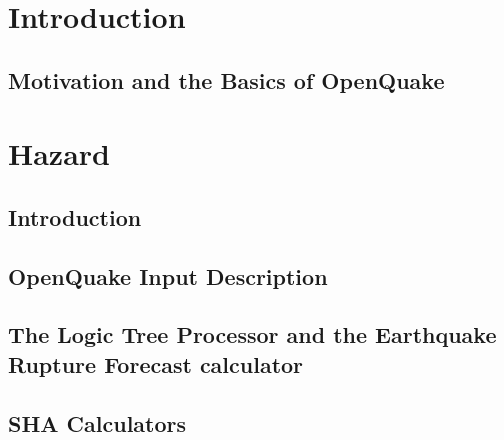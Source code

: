 \documentclass[11pt,a4paper,headings=small,dvips]{scrbook}
\begin{document}
\part{Introduction}
\chapter{Motivation and the Basics of OpenQuake}
	
\part{Hazard}
\chapter{Introduction}
	\label{chap:inthaz}
	
\chapter{OpenQuake Input Description}
	\label{chap:hazinp}
	
\chapter{The Logic Tree Processor and the Earthquake Rupture Forecast 
	calculator}
	\label{chap:erf}
	
	
\chapter{SHA Calculators}
	\label{chap:hazcalc}
	
	
	
	
%	
\end{document}
